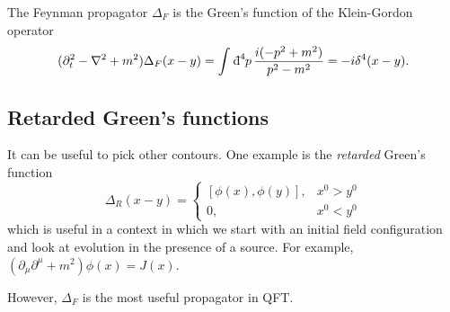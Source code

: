 The Feynman propagator $\Delta_F$ is the Green's function of the Klein-Gordon operator
\begin{equation}
  (\partial_t^2 - \laplacian + m^2) \Delta_F(x - y) = \int_{}^{} \bdd[4]{p} \frac{i (-p^2 + m^2)}{p^2 - m^2} = -i \delta^4 (x- y).
\end{equation}

\subsection{Retarded Green's functions}%
\label{sub:retarded_green_s_functions}

It can be useful to pick other contours. One example is the \emph{retarded} Green's function
\begin{equation}
  \Delta_R (x - y) = 
  \begin{cases}
    [\phi(x), \phi(y)], & x^0 > y^0 \\
    0, & x^0 < y^0
  \end{cases}
\end{equation}
which is useful in a context in which we start with  an initial field configuration and look at evolution in the presence of a source. For example, $(\partial_\mu \partial^\mu + m^2 )\phi(x) = J(x)$.

However, $\Delta_F$ is the most useful propagator in QFT.
